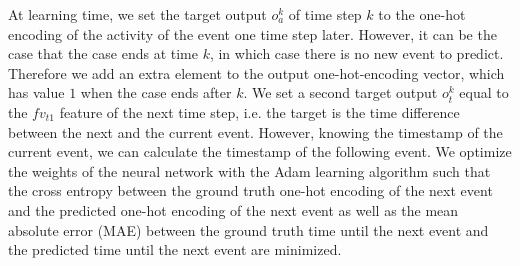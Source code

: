 \documentclass[runningheads,a4paper]{llncs}
\begin{document}
At learning time, we set the target output $o_a^k$ of time step $k$ to the one-hot encoding of the activity of the event one time step later. However, it can be the case that the case ends at time $k$, in which case there is no new event to predict. Therefore we add an extra element to the output one-hot-encoding vector, which has value $1$ when the case ends after $k$. We set a second target output $o_t^k$ equal to the $\mathit{fv_{t1}}$ feature of the next time step, i.e. the target is the time difference between the next and the current event. However, knowing the timestamp of the current event, we can calculate the timestamp of the following event. We optimize the weights of the neural network with the Adam learning algorithm \cite{Kingma2015} such that the cross entropy between the ground truth one-hot encoding of the next event and the predicted one-hot encoding of the next event as well as the mean absolute error (MAE) between the ground truth time until the next event and the predicted time until the next event are minimized. 
\end{document}
